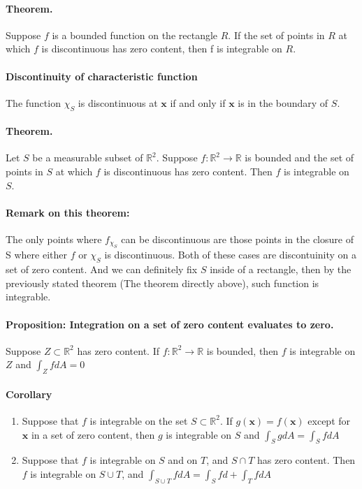 \documentclass[11pt]{article}
\newcommand{\bx}[0]{\mathbf{x}}
\newcommand{\real}[0]{\mathbb{R}}
\begin{document}
\paragraph{Theorem.} Suppose $f$ is a bounded function on the rectangle $R$. If the set of points in $R$ at which $f$ is discontinuous has zero content, then f is integrable on $R$.


\paragraph{Discontinuity of characteristic function} The function $\chi_S$ is discontinuous at $\bx$ if and only if $\bx$ is in the boundary of $S$.

\paragraph{Theorem.} Let $S$ be a measurable subset of $\real^2$. Suppose $f:{\real^2} \rightarrow{}{\real}$ is bounded and the set of points in $S$ at which $f$ is discontinuous has zero content. Then $f$ is integrable on $S$. 
\paragraph{Remark on this theorem:} The only points where $f_{\chi_S}$ can be discontinuous are those points in the closure of S where either $f$ or $\chi_S$ is discontinuous. Both of these cases are discontuinity on a set of zero content. And we can definitely fix $S$ inside of a rectangle, then by the previously stated theorem (The theorem directly above), such function is integrable.

\paragraph{Proposition: Integration on a set of zero content evaluates to zero.} Suppose $Z\subset \real^2$ has zero content. If $f:\real^2\rightarrow{} \real$ is bounded, then $f$ is integrable on $Z$ and $\int_Z fdA = 0$

\paragraph{Corollary}
\begin{enumerate}
    \item Suppose that $f$ is integrable on the set $S\subset \real^2$. If $g(\bx) = f(\bx)$ except for $\bx$ in a set of zero content, then $g$ is integrable on $S$ and $\int_S gdA = \int_S fdA$
    \item Suppose that $f$ is integrable on $S$ and on $T$, and $S\cap T$ has zero content. Then $f$ is integrable on $S\cup T$, and $\int_{S\cup T}fdA = \int_Sfd+ \int_TfdA$
\end{enumerate}
\end{document}
